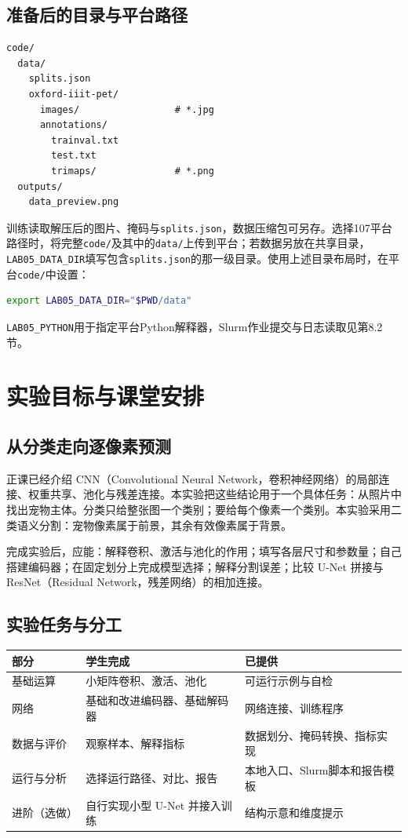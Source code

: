 \documentclass[UTF8,a4paper,11pt,fontset=fandol]{ctexart}
\newcommand{\file}[1]{\nolinkurl{#1}}
\begin{document}
\subsection{准备后的目录与平台路径}
\begin{lstlisting}[language={}]
code/
  data/
    splits.json
    oxford-iiit-pet/
      images/                 # *.jpg
      annotations/
        trainval.txt
        test.txt
        trimaps/              # *.png
  outputs/
    data_preview.png
\end{lstlisting}
训练读取解压后的图片、掩码与\file{splits.json}，数据压缩包可另存。选择107平台路径时，将完整\file{code/}及其中的\file{data/}上传到平台；若数据另放在共享目录，\file{LAB05_DATA_DIR}填写包含\file{splits.json}的那一级目录。使用上述目录布局时，在平台\file{code/}中设置：
\begin{lstlisting}[language=bash]
export LAB05_DATA_DIR="$PWD/data"
\end{lstlisting}
\file{LAB05_PYTHON}用于指定平台Python解释器，Slurm作业提交与日志读取见第8.2节。
\clearpage

\section{实验目标与课堂安排}
\subsection{从分类走向逐像素预测}
正课已经介绍 CNN（Convolutional Neural Network，卷积神经网络）的局部连接、权重共享、池化与残差连接。本实验把这些结论用于一个具体任务：从照片中找出宠物主体。分类只给整张图一个类别；要给每个像素一个类别。本实验采用二类语义分割：宠物像素属于前景，其余有效像素属于背景。

完成实验后，应能：解释卷积、激活与池化的作用；填写各层尺寸和参数量；自己搭建编码器；在固定划分上完成模型选择；解释分割误差；比较 U-Net 拼接与 ResNet（Residual Network，残差网络）的相加连接。
\subsection{实验任务与分工}
\par\noindent\begin{tabularx}{\linewidth}{L{2.4cm}YY}\toprule
部分 & 学生完成 & 已提供\\\midrule
基础运算 & 小矩阵卷积、激活、池化 & 可运行示例与自检\\
网络 & 基础和改进编码器、基础解码器 & 网络连接、训练程序\\
数据与评价 & 观察样本、解释指标 & 数据划分、掩码转换、指标实现\\
运行与分析 & 选择运行路径、对比、报告 & 本地入口、Slurm脚本和报告模板\\
进阶（选做） & 自行实现小型 U-Net 并接入训练 & 结构示意和维度提示\\\bottomrule
\end{tabularx}\par
\end{document}
